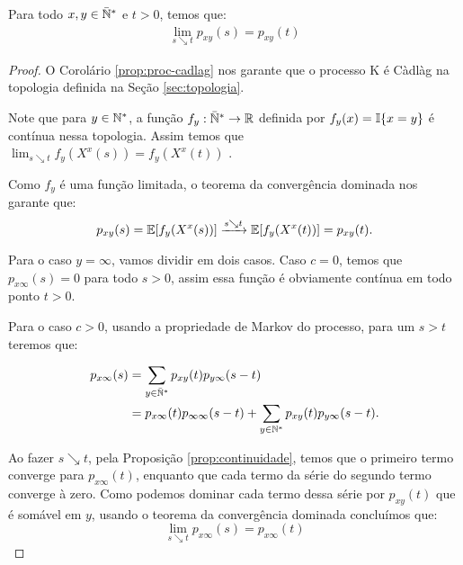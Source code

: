 \begin{lema}
  \label{lema:cont_direita_prob}
  Para todo $x, y \in {\mathbb{\bar{N}^*}}$ e $t > 0$, temos que:
  \begin{align}
    \lim_{s \searrow t} p_{x y} (s) = p_{x y} (t)
  \end{align}
\end{lema}
\begin{proof}
  O Corolário \ref{prop:proc-cadlag} nos garante que o processo K é
  Càdlàg na topologia definida na Seção \ref{sec:topologia}.

  Note que para $y \in {\mathbb{N^*}}$, a função $f_y: {\mathbb{\bar{N}^*}} \to {\mathbb{R}}$ definida por
  $f_y(x) = {\mathbb{I}}\{ x = y\}$ é contínua nessa topologia. Assim temos
  que $\lim_{s \searrow t} f_y(X^x(s)) = f_y (X^x(t))$ \qc.

  Como $f_y$ é uma função limitada, o teorema da convergência dominada
  nos garante que:
  \begin{displaymath}
    p_{x y} (s) = {\mathbb{E}}[f_y(X^x(s))] \xrightarrow{s \searrow t} {\mathbb{E}}[f_y
    (X^x(t))] = p_{x y} (t).
  \end{displaymath}

  Para o caso $y = \infty$, vamos dividir em dois casos.  Caso $c =
  0$, temos que $p_{x \infty} (s) = 0$ para todo $s > 0$, assim essa
  função é obviamente contínua em todo ponto $t > 0$.

  Para o caso $c > 0$, usando a propriedade de Markov do processo,
  para um $s > t$ teremos que:

  \begin{align*}
    p_{x \infty} (s) &= \sum_{y \in {\mathbb{\bar{N}^*}}} p_{x y} (t) p_{y \infty}
    (s - t) \\
    &= p_{x \infty} (t) p_{\infty \infty} (s - t) + 
    \sum_{y \in {\mathbb{N^*}}} p_{x y} (t) p_{y \infty} (s - t). \\
  \end{align*}


  Ao fazer $s \searrow t$, pela Proposição \ref{prop:continuidade},
  temos que o primeiro termo converge para $p_{x \infty}(t)$, enquanto
  que cada termo da série do segundo termo converge à zero. Como
  podemos dominar cada termo dessa série por $p_{x y} (t)$ que é
  somável em $y$, usando o teorema da convergência dominada concluímos
  que:
  \begin{displaymath}
    \lim_{s \searrow t} p_{x \infty} (s) = p_{x \infty} (t)
  \end{displaymath} 
\end{proof}

